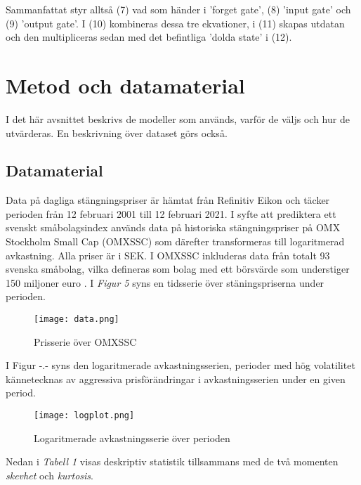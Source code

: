 \documentclass[12pt]{article}
\begin{document}
Sammanfattat styr alltså (7) vad som händer i 'forget gate', (8) 'input gate' och (9) 'output gate'. I (10) kombineras dessa tre ekvationer, i (11) skapas utdatan och den multipliceras sedan med det befintliga 'dolda state' i (12). 


\section{Metod och datamaterial}
I det här avsnittet beskrivs de modeller som används, varför de väljs och hur de utvärderas. En beskrivning över dataset görs också. 

\subsection{Datamaterial}

Data på dagliga stängningspriser är hämtat från Refinitiv Eikon och täcker perioden från 12 februari 2001 till 12 februari 2021. I syfte att prediktera ett svenskt småbolagsindex används data på historiska stängningspriser på OMX Stockholm Small Cap (OMXSSC) som därefter transformeras till logaritmerad avkastning. Alla priser är i SEK. I OMXSSC inkluderas data från totalt 93 svenska småbolag, vilka defineras som bolag med ett börsvärde som understiger 150 miljoner euro \parencite{smabalagsdefinition}. I \emph{Figur 5} syns en tidsserie över stäningspriserna under perioden.

\begin{figure}[H]
\caption{Prisserie över OMXSSC}
\texttt{[image: data.png]}
\centering
\end{figure}

I Figur -.- syns den logaritmerade avkastningsserien, perioder med hög volatilitet kännetecknas av aggressiva prisförändringar i avkastningsserien under en given period.

\begin{figure}[H]
\caption{Logaritmerade avkastningsserie över perioden}
\texttt{[image: logplot.png]}
\centering
\end{figure}

Nedan i \emph{Tabell 1} visas deskriptiv statistik tillsammans med de två momenten \emph{skevhet} och \emph{kurtosis}. 

\begin{table}[H]
\caption{Deskprivtiv statistik och moment}
\end{table}
\end{document}
